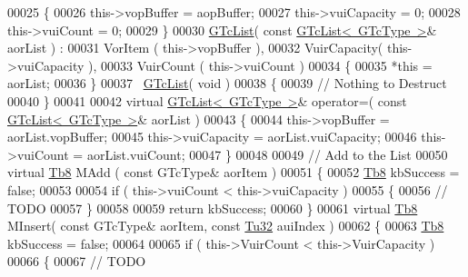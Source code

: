 \begin{DoxyCode}
00025          \{
00026             this->vopBuffer   = aopBuffer;
00027             this->vuiCapacity = 0;
00028             this->vuiCount    = 0;
00029          \}
00030          \mbox{\hyperlink{class_g_n_common_1_1_n_containers_1_1_g_tc_list}{GTcList}}( \textcolor{keyword}{const} \mbox{\hyperlink{class_g_n_common_1_1_n_containers_1_1_g_tc_list}{GTcList< GTcType >}}& aorList ) :
00031             VorItem     ( this->vopBuffer   ),
00032             VuirCapacity( this->vuiCapacity ),
00033             VuirCount   ( this->vuiCount    )
00034          \{
00035             *\textcolor{keyword}{this} = aorList;
00036          \}
00037          ~\mbox{\hyperlink{class_g_n_common_1_1_n_containers_1_1_g_tc_list}{GTcList}}( \textcolor{keywordtype}{void} )
00038          \{
00039             \textcolor{comment}{// Nothing to Destruct}
00040          \}
00041 
00042          \textcolor{keyword}{virtual} \mbox{\hyperlink{class_g_n_common_1_1_n_containers_1_1_g_tc_list}{GTcList< GTcType >}}& operator=( \textcolor{keyword}{const} 
      \mbox{\hyperlink{class_g_n_common_1_1_n_containers_1_1_g_tc_list}{GTcList< GTcType >}}& aorList )
00043          \{
00044             this->vopBuffer   = aorList.vopBuffer;
00045             this->vuiCapacity = aorList.vuiCapacity;
00046             this->vuiCount    = aorList.vuiCount;
00047          \}
00048 
00049          \textcolor{comment}{// Add to the List}
00050          \textcolor{keyword}{virtual} \mbox{\hyperlink{namespace_g_n_common_a8115dc7ed53b6e5b52e6bfde1632ea74}{Tb8}} MAdd   ( \textcolor{keyword}{const} GTcType& aorItem )
00051          \{
00052             \mbox{\hyperlink{namespace_g_n_common_a8115dc7ed53b6e5b52e6bfde1632ea74}{Tb8}} kbSuccess = \textcolor{keyword}{false};
00053 
00054             \textcolor{keywordflow}{if} ( this->vuiCount < this->vuiCapacity )
00055             \{
00056                \textcolor{comment}{// TODO}
00057             \}
00058 
00059             \textcolor{keywordflow}{return} kbSuccess;
00060          \}
00061          \textcolor{keyword}{virtual} \mbox{\hyperlink{namespace_g_n_common_a8115dc7ed53b6e5b52e6bfde1632ea74}{Tb8}} MInsert( \textcolor{keyword}{const} GTcType& aorItem, \textcolor{keyword}{const} \mbox{\hyperlink{namespace_g_n_common_a941b527ef318f318aed7903dc832b7e4}{Tu32}} auiIndex )
00062          \{
00063             \mbox{\hyperlink{namespace_g_n_common_a8115dc7ed53b6e5b52e6bfde1632ea74}{Tb8}} kbSuccess = \textcolor{keyword}{false};
00064 
00065             \textcolor{keywordflow}{if} ( this->VuirCount < this->VuirCapacity )
00066             \{
00067                \textcolor{comment}{// TODO}

\end{DoxyCode}
